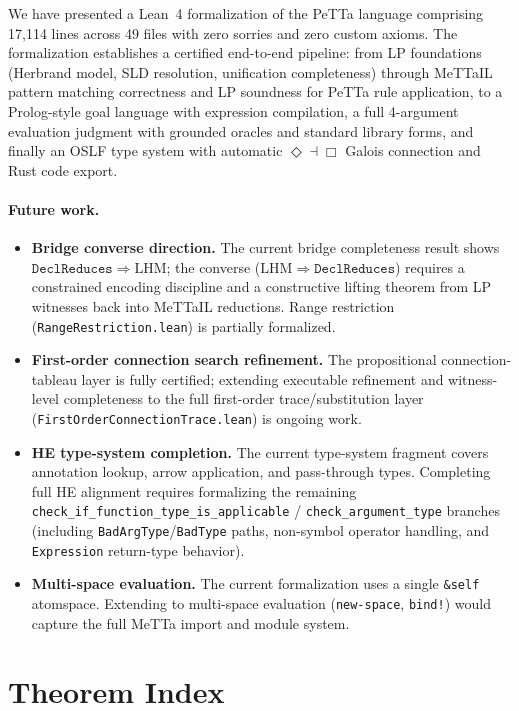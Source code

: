 \documentclass[]{article}
\newcommand{\code}[1]{\texttt{#1}}
\newcommand{\MeTTa}{\textup{MeTTa}}
\newcommand{\PeTTa}{\textup{PeTTa}}
\newcommand{\MeTTaIL}{\textup{MeTTaIL}}
\newcommand{\OSLF}{\textup{OSLF}}
\begin{document}
We have presented a Lean~4 formalization of the \PeTTa{} language comprising
17{,}114 lines across 49 files with zero sorries and zero custom axioms.
The formalization establishes a certified end-to-end pipeline: from LP
foundations (Herbrand model, SLD resolution, unification completeness) through
\MeTTaIL{} pattern matching correctness and LP soundness for \PeTTa{}
rule application, to a Prolog-style goal language with expression compilation,
a full 4-argument evaluation judgment with grounded oracles and standard
library forms, and finally an \OSLF{} type system with automatic
$\Diamond \dashv \Box$ Galois connection and Rust code export.

\paragraph{Future work.}
\begin{itemize}
\item \textbf{Bridge converse direction.} The current bridge completeness result
  shows $\code{DeclReduces} \Rightarrow \mathrm{LHM}$; the converse
  ($\mathrm{LHM} \Rightarrow \code{DeclReduces}$) requires a constrained
  encoding discipline and a constructive lifting theorem from LP witnesses back
  into \MeTTaIL{} reductions.  Range restriction (\code{RangeRestriction.lean})
  is partially formalized.
\item \textbf{First-order connection search refinement.} The propositional
  connection-tableau layer is fully certified; extending executable refinement
  and witness-level completeness to the full first-order
  trace/substitution layer (\code{FirstOrderConnectionTrace.lean}) is
  ongoing work.
\item \textbf{HE type-system completion.} The current type-system fragment
  covers annotation lookup, arrow application, and pass-through types.
  Completing full HE alignment requires formalizing the remaining
  \code{check\_if\_function\_type\_is\_applicable} /
  \code{check\_argument\_type} branches (including
  \code{BadArgType}/\code{BadType} paths, non-symbol operator handling, and
  \code{Expression} return-type behavior).
\item \textbf{Multi-space evaluation.} The current formalization uses a single
  \code{\&self} atomspace.  Extending to multi-space evaluation
  (\code{new-space}, \code{bind!}) would capture the full \MeTTa{} import
  and module system.
\end{itemize}

\appendix
\section{Theorem Index}
\end{document}
